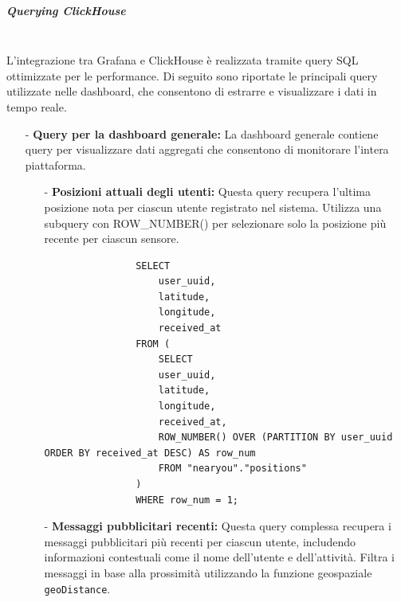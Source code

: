 \documentclass[10pt]{article}
\newcommand{\mysubparagraph}[1]{\subparagraph{#1}\mbox{}\\}
\begin{document}
        \mysubparagraph{Querying ClickHouse}
        L'integrazione tra Grafana e ClickHouse è realizzata tramite query SQL ottimizzate per le performance. Di seguito sono riportate le principali query utilizzate nelle dashboard, che consentono di estrarre e visualizzare i dati in tempo reale.
        \begin{itemize}

        \item[-] \textbf{Query per la dashboard generale:} 
        La dashboard generale contiene query per visualizzare dati aggregati che consentono di monitorare l'intera piattaforma.

            \begin{itemize}
                \item[-] \textbf{Posizioni attuali degli utenti:}
                Questa query recupera l'ultima posizione nota per ciascun utente registrato nel sistema. Utilizza una subquery con ROW_NUMBER() per selezionare solo la posizione più recente per ciascun sensore.
                
                \begin{lstlisting}
                SELECT 
                    user_uuid, 
                    latitude, 
                    longitude, 
                    received_at
                FROM (
                    SELECT 
                    user_uuid, 
                    latitude, 
                    longitude, 
                    received_at,
                    ROW_NUMBER() OVER (PARTITION BY user_uuid ORDER BY received_at DESC) AS row_num
                    FROM "nearyou"."positions"
                ) 
                WHERE row_num = 1;
                \end{lstlisting}
                
                \item[-] \textbf{Messaggi pubblicitari recenti:}
                Questa query complessa recupera i messaggi pubblicitari più recenti per ciascun utente, includendo informazioni contestuali come il nome dell'utente e dell'attività. Filtra i messaggi in base alla prossimità utilizzando la funzione geospaziale \texttt{geoDistance}.
                

\end{itemize}
\end{itemize}
\end{document}
